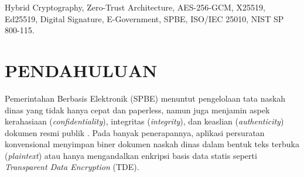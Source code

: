 \documentclass[conference]{IEEEtran}
\begin{document}
\begin{abstract}
\textit{English Abstract}---Conventional Electronic Official Correspondence Systems (TNDE) in government institutions are often vulnerable to database-level data leaks and insider attacks. Reliance on Transparent Data Encryption (TDE) and Transport Layer Security (TLS) fails to protect documents at data-at-rest and data-in-use states. This research proposes \textbf{SecureOffice-AI}, a Zero-Trust digital correspondence platform employing Object-Level Encryption via Hybrid Cryptography. The system integrates \textbf{AES-256-GCM} symmetric encryption for document payloads, \textbf{X25519} elliptic curve key wrapping for secure key distribution, and \textbf{Ed25519} digital signatures for non-repudiation. Evaluated against \textbf{ISO/IEC 25010:2011}, \textbf{NIST SP 800-115}, and \textbf{FIPS 140-3} standards, empirical results demonstrate 100\% tamper rejection against database administrator (DBA) active attacks, sub-millisecond to low latencies (1.65 ms for 100 KB to 13.46 ms for 50 MB files), throughput up to 4.20 GB/s, and 70\% heap memory savings compared to RSA-4096.
\end{abstract}

\begin{IEEEkeywords}
Hybrid Cryptography, Zero-Trust Architecture, AES-256-GCM, X25519, Ed25519, Digital Signature, E-Government, SPBE, ISO/IEC 25010, NIST SP 800-115.
\end{IEEEkeywords}

\section{PENDAHULUAN}
 Pemerintahan Berbasis Elektronik (SPBE) menuntut pengelolaan tata naskah dinas yang tidak hanya cepat dan paperless, namun juga menjamin aspek kerahasiaan (\textit{confidentiality}), integritas (\textit{integrity}), dan keaslian (\textit{authenticity}) dokumen resmi publik \cite{mergel2019defining}. Pada banyak penerapannya, aplikasi persuratan konvensional menyimpan biner dokumen naskah dinas dalam bentuk teks terbuka (\textit{plaintext}) atau hanya mengandalkan enkripsi basis data statis seperti \textit{Transparent Data Encryption} (TDE).
\end{document}

